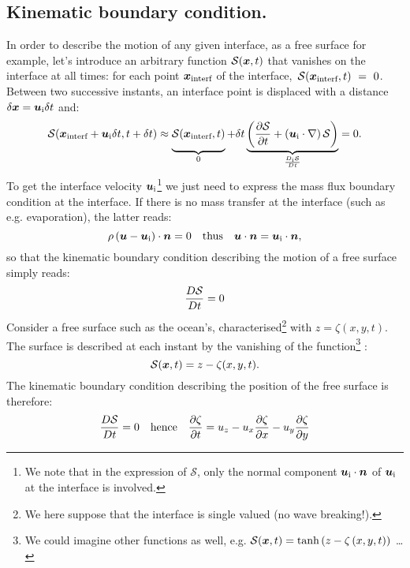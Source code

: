 \subsection{Kinematic boundary condition.} In order to describe the motion of any given interface, as a free surface for example, let's introduce an arbitrary function $\mathcal S(\bx,t)$ that vanishes on the interface at all times: for each point $\bx_\text{interf}$ of the interface,~$\mathcal S(\bx_\text{interf},t)~=~0$. Between two successive instants, an interface point is displaced with a distance $\delbx = \bu_\text i \delt$ and:
\begin{equation}
\mathcal S(\bx_\text{interf} + \bu_\text i \delt, t + \delt) \approx \underbrace{\vphantom{\lp\pd{\mathcal S}{t}\rp}\mathcal S(\bx_\text{interf},t)}_0 + \delt\underbrace{\lp\pd{\mathcal S}{t} + \lp\bu_\text  i \cdot \nabla\rp\mathcal S\rp}_{\D{_\text i\mathcal S}{t}} = 0.
\end{equation}
To get the interface velocity $\bu_\text i$\footnote{We note that in the expression of $\mathcal S$, only the normal component $\bu_\text i \cdot \bn$ of $\bu_\text i$ at the interface is involved.} we just need to express the mass flux boundary condition at the interface. If there is no mass transfer at the interface (such as e.g. evaporation), the latter reads:
\begin{equation}
\rho \lp \bu - \bu_\text i\rp \cdot \bn = 0 \quad \text{thus} \quad \bu \cdot \bn = \bu_\text i \cdot \bn,
\end{equation}
so that the kinematic boundary condition describing the motion of a free surface simply reads:
\begin{equation}
\frac{D \mathcal S}{D t} = 0
\end{equation}
 Consider a free surface such as the ocean's, characterised\footnote{We here suppose that the interface is single valued (no wave breaking!).} with $z = \zeta(x,y,t)$. The surface is described at each instant by the vanishing of the function\footnote{We could imagine other functions as well, e.g. $\mathcal S(\bx,t) = \tanh\lp z - \zeta\lp x,y,t\rp\rp$ \ldots} :
\begin{equation}
\mathcal S(\bx,t) = z - \zeta(x,y,t).
\label{eq:bumped_free_surface}
\end{equation}
The kinematic boundary condition describing the position of the free surface is therefore:
\begin{equation}
\frac{D \mathcal S}{D t} = 0 \quad \text{hence}\quad \frac{\partial \zeta}{\partial t} = u_z - u_x \frac{\partial \zeta}{\partial x} - u_y \frac{\partial \zeta}{\partial y}
\end{equation}
